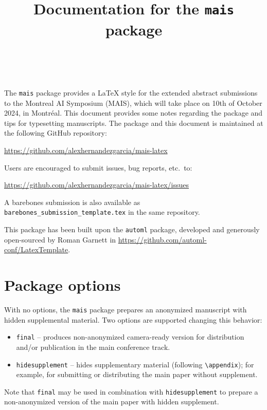 \documentclass[11pt]{article}
\title{Documentation for the \texttt{mais} package}
\author[1]{\nameemail{Author 1}{email1@example.com}}
\author[2,3]{\nameemail{Author 2}{email2@example.com}}
\author[3]{\nameemail{Author 3}{email3@example.com}}
\author[4]{\nameemail{Author 4}{email4@example.com}}
\author[3]{\\\nameemail{Author 5}{email5@example.com}}
\affil[1]{Institution 1}
\affil[2]{Institution 2}
\affil[3]{Institution 3}
\affil[4]{Institution 4}
\begin{document}
\maketitle

The \texttt{mais} package provides a \LaTeX{} style for the extended abstract submissions to the Montreal AI Symposium (MAIS), which will take place on 10th of October 2024, in Montréal. This document provides some notes regarding the package and tips for typesetting manuscripts. The package and this document is maintained at the following GitHub
repository:

\begin{center}
  \url{https://github.com/alexhernandezgarcia/mais-latex}
\end{center}

Users are encouraged to submit issues, bug reports, etc.\ to:

\begin{center}
  \url{https://github.com/alexhernandezgarcia/mais-latex/issues}
\end{center}

A barebones submission is also available as \texttt{barebones\_submission\_template.tex} in the same repository.

This package has been built upon the \texttt{automl} package, developed and generously open-sourced by Roman Garnett in \url{https://github.com/automl-conf/LatexTemplate}.

\section{Package options}

With no options, the \texttt{mais} package prepares an anonymized manuscript with hidden supplemental material. Two options are supported changing this behavior:

\begin{itemize}
\item \texttt{final} -- produces non-anonymized camera-ready version for distribution and/or publication in the main conference track.
\item \texttt{hidesupplement} -- hides supplementary material (following \verb|\appendix|); for example, for submitting or distributing the main paper without supplement.
\end{itemize}

Note that \texttt{final} may be used in combination with \texttt{hidesupplement} to prepare a non-anonymized version of the main paper with hidden supplement.
\end{document}
